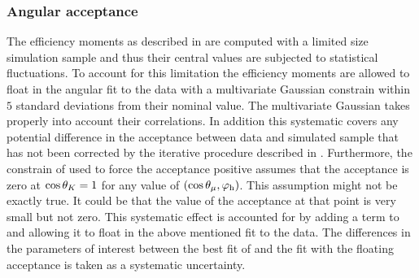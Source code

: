 \subsubsection{Angular acceptance}
\label{systAngAcc}
The efficiency moments as described in  are computed with a limited size simulation sample
and thus their central values are subjected to statistical fluctuations. To account for this limitation the
efficiency moments are allowed to float in the angular fit to the data with a multivariate Gaussian constrain within $5$
standard deviations from their nominal value. The multivariate Gaussian takes properly into account their correlations.
In addition this systematic covers any potential difference in the acceptance between data and simulated sample
that has not been corrected by the iterative procedure described in . Furthermore,
the constrain of  used to force the acceptance positive assumes that the acceptance is zero
at $\cos\theta_{K}=1$ for any value of $(\cos\theta_{\mu},{\varphi_{\text h}})$. This assumption might not be exactly true. It could be
that the value of the acceptance at that point is very small but not zero. This systematic effect is accounted for
by adding a term to  and allowing it to
float in the above mentioned fit to the data. The differences in the parameters of interest between the best fit
of  and the fit with the floating acceptance is taken as a systematic uncertainty.

